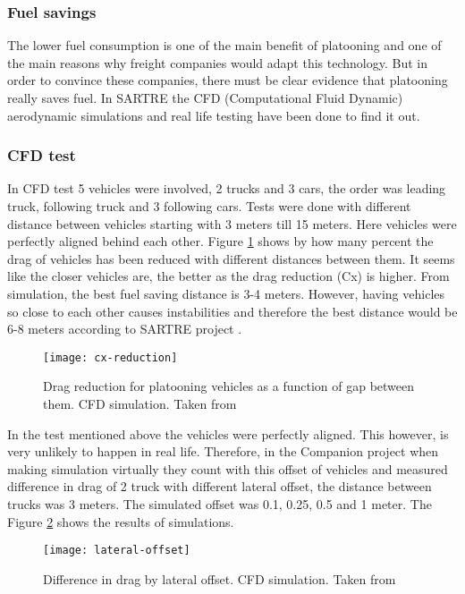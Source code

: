 \subsubsection{Fuel savings}\label{sec:fuel-savings}
% 
The lower fuel consumption is one of the main benefit of platooning and one of the main reasons why freight companies would adapt this technology. But in order to convince these companies, there must be clear evidence that platooning really saves fuel. In SARTRE \cite{Chan2012ProjectSARTRE} the CFD (Computational Fluid Dynamic) aerodynamic simulations and real life testing have been done to find it out.
%
\subsubsection*{CFD test}
In CFD test 5 vehicles were involved, 2 trucks and 3 cars, the order was leading truck, following truck and 3 following cars. Tests were done with different distance between vehicles starting with 3 meters till 15 meters. Here vehicles were perfectly aligned behind each other. Figure \ref{fig:cx-reduction} shows by how many percent the drag of vehicles has been reduced with different distances between them. It seems like the closer vehicles are, the better as the drag reduction (Cx) is higher. From simulation, the best fuel saving distance is 3-4 meters. However, having vehicles so close to each other causes instabilities and therefore the best distance would be 6-8 meters according to SARTRE project \cite[p. 33]{Chan2012ProjectSARTRE}.\par
% 
\begin{figure}[p]
    \centering
    \texttt{[image: cx-reduction]}
    \caption{Drag reduction for platooning vehicles as a function of gap between them. CFD simulation. Taken from \cite{Chan2012ProjectSARTRE}}
    \label{fig:cx-reduction}
\end{figure}
% 
In the test mentioned above the vehicles were perfectly aligned. This however, is very unlikely to happen in real life. Therefore, in the Companion project when making simulation virtually they count with this offset of vehicles and measured difference in drag of 2 truck with different lateral offset, the distance between trucks was 3 meters. The simulated offset was 0.1, 0.25, 0.5 and 1 meter. The Figure \ref{fig:lateral-offset} shows the results of simulations.
% 
\begin{figure}[p]
    \centering
    \texttt{[image: lateral-offset]}
    \caption{Difference in drag by lateral offset. CFD simulation. Taken from \cite[p. 19]{Laxhammar2015CooperativeConsumption}}
    \label{fig:lateral-offset}
\end{figure}
